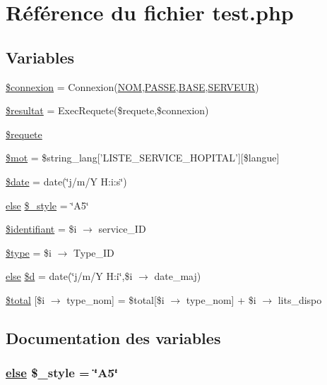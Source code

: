 \hypertarget{services_2epidemio_2test_8php}{
\section{R\'{e}f\'{e}rence du fichier test.php}
\label{services_2epidemio_2test_8php}
}
\subsection*{Variables}
\begin{CompactItemize}
\item 
\hyperlink{services_2epidemio_2test_8php_a0}{\$connexion} = Connexion(\hyperlink{pma__connect_8php_a0}{NOM},\hyperlink{pma__connect_8php_a1}{PASSE},\hyperlink{pma__connect_8php_a3}{BASE},\hyperlink{pma__connect_8php_a2}{SERVEUR})
\item 
\hyperlink{services_2epidemio_2test_8php_a1}{\$resultat} = Exec\-Requete(\$requete,\$connexion)
\item 
\hyperlink{services_2epidemio_2test_8php_a2}{\$requete}
\item 
\hyperlink{services_2epidemio_2test_8php_a3}{\$mot} = \$string\_\-lang\mbox{[}'LISTE\_\-SERVICE\_\-HOPITAL'\mbox{]}\mbox{[}\$langue\mbox{]}
\item 
\hyperlink{services_2epidemio_2test_8php_a4}{\$date} = date(\char`\"{}j/m/Y H:i:s\char`\"{})
\item 
\hyperlink{cron_8php_a9}{else} \hyperlink{services_2epidemio_2test_8php_a5}{\$\_\-style} = \char`\"{}A5\char`\"{}
\item 
\hyperlink{services_2epidemio_2test_8php_a6}{\$identifiant} = \$i $\rightarrow$ service\_\-ID
\item 
\hyperlink{services_2epidemio_2test_8php_a7}{\$type} = \$i $\rightarrow$ Type\_\-ID
\item 
\hyperlink{cron_8php_a9}{else} \hyperlink{services_2epidemio_2test_8php_a8}{\$d} = date(\char`\"{}j/m/Y H:i\char`\"{},\$i $\rightarrow$ date\_\-maj)
\item 
\hyperlink{services_2epidemio_2test_8php_a9}{\$total} \mbox{[}\$i $\rightarrow$ type\_\-nom\mbox{]} = \$total\mbox{[}\$i $\rightarrow$ type\_\-nom\mbox{]} + \$i $\rightarrow$ lits\_\-dispo
\end{CompactItemize}


\subsection{Documentation des variables}
\hypertarget{services_2epidemio_2test_8php_a5}{
\subsubsection[\$\_\-style]{\setlength{\rightskip}{0pt plus 5cm}\hyperlink{cron_8php_a9}{else} \$\_\-style = \char`\"{}A5\char`\"{}}}
\label{services_2epidemio_2test_8php_a5}


